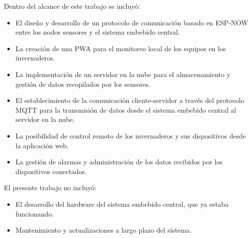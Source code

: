 Dentro del alcance de este trabajo se incluyó:
\begin{itemize}
	\item El diseño y desarrollo de un protocolo de comunicación basado en ESP-NOW entre los nodos sensores y el sistema embebido central.
	\item La creación de una PWA para el monitoreo local de los equipos en los invernaderos.
	\item La implementación de un servidor en la nube para el almacenamiento y gestión de datos recopilados por los sensores.
	\item El establecimiento de la comunicación cliente-servidor a través del protocolo MQTT para la transmisión de datos desde el sistema embebido central al servidor en la nube.
	\item La posibilidad de control remoto de los invernaderos y sus dispositivos desde la aplicación web.
	\item La gestión de alarmas y administración de los datos recibidos por los dispositivos conectados.
\end{itemize}

El presente trabajo no incluyó:

\begin{itemize}
	\item El desarrollo del hardware del sistema embebido central, que ya estaba funcionando.
	\item Mantenimiento y actualizaciones a largo plazo del sistema.
\end{itemize}



